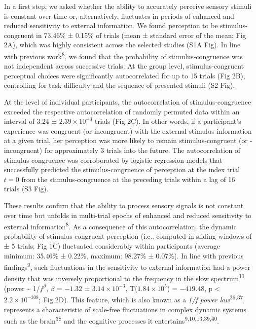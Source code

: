 \documentclass[
]{article}
\begin{document}
In a first step, we asked whether the ability to accurately perceive
sensory stimuli is constant over time or, alternatively, fluctuates in
periods of enhanced and reduced sensitivity to external information. We
found perception to be stimulus-congruent in 73.46\% ± 0.15\% of trials
(mean ± standard error of the mean; Fig 2A), which was highly
consistent across the selected studies (S1A Fig). In
line with previous work\textsuperscript{8}, we found that the
probability of stimulus-congruence was not independent across successive
trials: At the group level, stimulus-congruent perceptual choices were
significantly autocorrelated for up to 15 trials (Fig 2B),
controlling for task difficulty and the sequence of presented stimuli
(S2 Fig).

At the level of individual participants, the autocorrelation of
stimulus-congruence exceeded the respective autocorrelation of randomly
permuted data within an interval of \(3.24\) ±
\(\ensuremath{2.39\times 10^{-3}}\) trials (Fig 2C). In other words,
if a participant's experience was congruent (or incongruent) with the
external stimulus information at a given trial, her perception was more
likely to remain stimulus-congruent (or -incongruent) for approximately
3 trials into the future. The autocorrelation of stimulus-congruence was
corroborated by logistic regression models that successfully predicted
the stimulus-congruence of perception at the index trial \(t = 0\) from
the stimulus-congruence at the preceding trials within a lag of 16
trials (S3 Fig).

These results confirm that the ability to process sensory signals is not
constant over time but unfolds in multi-trial epochs of enhanced and
reduced sensitivity to external information\textsuperscript{8}. As a
consequence of this autocorrelation, the dynamic probability of
stimulus-congruent perception (i.e., computed in sliding windows of ± 5
trials; Fig 1C) fluctuated considerably within participants (average
minimum: 35.46\% ± 0.22\%, maximum: 98.27\% ± 0.07\%). In line with
previous findings\textsuperscript{9}, such fluctuations in the
sensitivity to external information had a power density that was
inversely proportional to the frequency in the slow
spectrum\textsuperscript{11} (power \textasciitilde{} 1/\(f^\beta\),
\(\beta\) = \(-1.32\) ± \(\ensuremath{3.14\times 10^{-3}}\),
T(\(\ensuremath{1.84\times 10^{5}}\)) = \(-419.48\), p < \(\ensuremath{2.2\times 10^{-308}}\); Fig
2D). This feature, which is also known as a \emph{1/f power
law}\textsuperscript{36,37}, represents a characteristic of scale-free
fluctuations in complex dynamic systems such as the
brain\textsuperscript{38} and the cognitive processes it
entertains\textsuperscript{9,10,13,39,40}.
\end{document}
